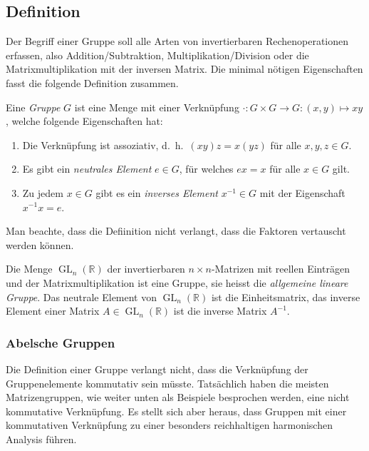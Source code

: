 %
%
%

%
%
\subsection{Definition
\label{buch:gruppen:subsection:definition}}
Der Begriff einer Gruppe soll alle Arten von invertierbaren Rechenoperationen
erfassen, also Addition/Subtraktion, Multiplikation/Division oder
die Matrixmultiplikation mit der inversen Matrix.
Die minimal nötigen Eigenschaften fasst die folgende Definition zusammen.

\begin{definition}
\label{buch:gruppen:definition:gruppe}
Eine {\em Gruppe} $G$ ist eine Menge mit einer Verknüpfung
$\cdot \colon G\times G\to G : (x,y) \mapsto xy $, welche folgende
Eigenschaften hat:
\begin{enumerate}
\item
Die Verknüpfung ist assoziativ, d.~h.~$(xy)z=x(yz)$ für alle
$x,y,z\in G$.
\item
Es gibt ein {\em neutrales Element} $e\in G$, für welches $ex=x$ für alle
$x\in G$ gilt.
%
\item 
Zu jedem $x\in G$ gibt es ein {\em inverses Element} $x^{-1}\in G$ mit der
Eigenschaft $x^{-1}x=e$.
%
\end{enumerate}
\end{definition}

Man beachte, dass die Defiinition nicht verlangt, dass die Faktoren
vertauscht werden können. 

\begin{beispiel}
Die Menge $\operatorname{GL}_n(\mathbb{R})$ der invertierbaren
$n\times n$-Matrizen mit reellen Einträgen und der Matrixmultiplikation
ist eine Gruppe, sie heisst die {\em allgemeine lineare Gruppe}.
%
%
Das neutrale Element von $\operatorname{GL}_n(\mathbb{R})$ ist die
Einheitsmatrix, das inverse Element einer Matrix
$A\in \operatorname{GL}_n(\mathbb{R})$
ist die inverse Matrix $A^{-1}$.
\end{beispiel}

%
%
\subsubsection{Abelsche Gruppen}
Die Definition einer Gruppe verlangt nicht, dass die Verknüpfung der
Gruppenelemente kommutativ sein müsste.
Tatsächlich haben die meisten Matrizengruppen, wie weiter unten als 
Beispiele besprochen werden, eine nicht kommutative Verknüpfung.
Es stellt sich aber heraus, dass Gruppen mit einer kommutativen
Verknüpfung zu einer besonders reichhaltigen harmonischen Analysis
führen.

